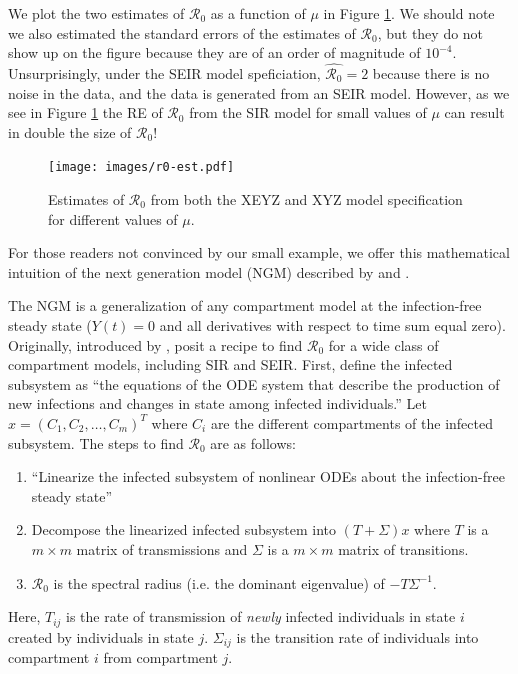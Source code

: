\documentclass[12pt]{article}
\newcommand{\rr}{\ensuremath{\mathcal{R}_0}}
\begin{document}
We plot the two estimates of $\rr$ as a function of $\mu$ in Figure \ref{fig:r0-alpha}.  We should note we also estimated the standard errors of the estimates of $\rr$, but they do not show up on the figure because they are of an order of magnitude of $10^{-4}$.  Unsurprisingly, under the SEIR model speficiation, $\hat{\rr}=2$ because there is no noise in the data, and the data is generated from an SEIR model.  However, as we see in Figure \ref{fig:r0-alpha} the RE of $\rr$ from the SIR model for small values of $\mu$ can result in double the size of $\rr$!

\begin{figure}
  \centering
  \texttt{[image: images/r0-est.pdf]}
  \caption{Estimates of $\rr$ from both the XEYZ and XYZ model specification for different values of $\mu$.}\label{fig:r0-alpha}
  \end{figure}


For those readers not convinced by our small example, we offer this mathematical intuition of the next generation model (NGM) described by \cite{diekmann1990} and \cite{diekmann2009}.

 The NGM is a generalization of any compartment model at the infection-free steady state ($Y(t)=0$ and all derivatives with respect to time sum equal zero). Originally, introduced by \citep{diekmann1990}, \cite{diekmann2009} posit a recipe to find $\rr$ for a wide class of compartment models, including SIR and SEIR. First, define the infected subsystem as ``the equations of the ODE system that describe the production of new infections and changes in state among infected individuals.''  Let $x = (C_1, C_2, \dots, C_m)^T$ where $C_i$ are the different compartments of the infected subsystem.  The steps to find $\rr$ are as follows:


\begin{enumerate}
\item ``Linearize the infected subsystem of nonlinear ODEs about the infection-free steady state''
\item Decompose the linearized infected subsystem into $(T + \Sigma )x$ where $T$ is a $m\times m$ matrix of transmissions and $\Sigma$ is a $m \times m$ matrix of transitions.
\item $\rr$ is the spectral radius (i.e. the dominant eigenvalue) of $-T \Sigma^{-1}$.  
\end{enumerate}

Here, $T_{ij}$ is the rate of transmission of \textit{newly} infected individuals in state $i$ created by individuals in state $j$.  $\Sigma_{ij}$ is the transition rate of individuals into compartment $i$ from compartment $j$.
\end{document}
